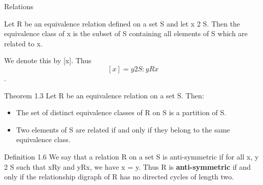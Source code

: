\documentclass{beamer}
\begin{document}
\begin{frame}{Relations}

\Large
Let R be an equivalence relation defined on a set S and let x 2 S. 
Then the equivalence class of x is the subset of S containing all
elements of S which are related to x. 

We denote this by [x]. Thus
\[[x] = {y 2 S : yRx}\].

\end{frame}

\begin{frame}

\Large
Theorem 1.3 
Let R be an equivalence relation on a set S. Then:
\begin{itemize}
\item The set of distinct equivalence classes of R on S is a partition of S.
\item Two elements of S are related if and only if they belong to the same equivalence
class.
\end{itemize}
\end{frame}
\begin{frame}

\Large
Definition 1.6 We say that a relation R on a set S is anti-symmetric if for
all x, y 2 S such that xRy and yRx, we have x = y. 
Thus R is \textbf{anti-symmetric}
if and only if the relationship digraph of R has no directed cycles of length two.
\end{frame}
\end{document}
